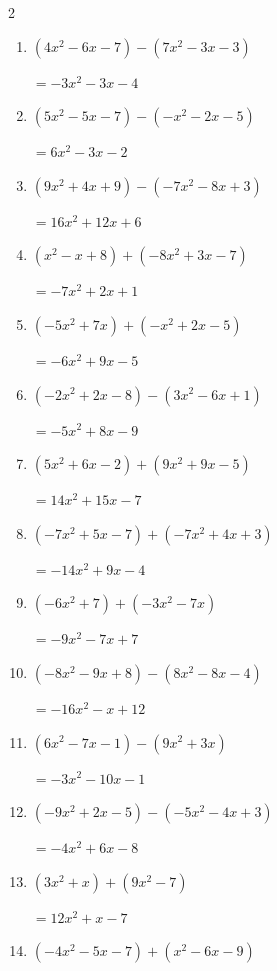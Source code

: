 \begin{multicols}{2}
\begin{enumerate}
        $=-8x^{2}+3x-9$

  \item $(4x^{2}-6x-7)-(7x^{2}-3x-3)$

        $=-3x^{2}-3x-4$

  \item $(5x^{2}-5x-7)-(-x^{2}-2x-5)$

        $=6x^{2}-3x-2$

  \item $(9x^{2}+4x+9)-(-7x^{2}-8x+3)$

        $=16x^{2}+12x+6$

  \item $(x^{2}-x+8)+(-8x^{2}+3x-7)$

        $=-7x^{2}+2x+1$

  \item $(-5x^{2}+7x)+(-x^{2}+2x-5)$

        $=-6x^{2}+9x-5$

  \item $(-2x^{2}+2x-8)-(3x^{2}-6x+1)$

        $=-5x^{2}+8x-9$

  \item $(5x^{2}+6x-2)+(9x^{2}+9x-5)$

        $=14x^{2}+15x-7$

\columnbreak %

  \item $(-7x^{2}+5x-7)+(-7x^{2}+4x+3)$

        $=-14x^{2}+9x-4$

  \item $(-6x^{2}+7)+(-3x^{2}-7x)$

        $=-9x^{2}-7x+7$

  \item $(-8x^{2}-9x+8)-(8x^{2}-8x-4)$

        $=-16x^{2}-x+12$

  \item $(6x^{2}-7x-1)-(9x^{2}+3x)$

        $=-3x^{2}-10x-1$

  \item $(-9x^{2}+2x-5)-(-5x^{2}-4x+3)$

        $=-4x^{2}+6x-8$

  \item $(3x^{2}+x)+(9x^{2}-7)$

        $=12x^{2}+x-7$

  \item $(-4x^{2}-5x-7)+(x^{2}-6x-9)$


\end{enumerate}
\end{multicols}
